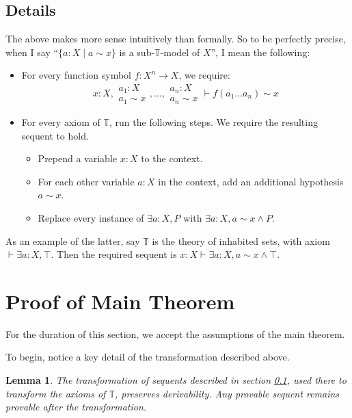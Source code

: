 \documentclass{article}
\newtheorem{lemma}[theorem]{Lemma}
\newcommand*{\T}{\mathbb{T}}
\begin{document}
\subsection{Details} \label{Details}

The above makes more sense intuitively than formally.
So to be perfectly precise, when I say
``\(\{a : X \mid a \sim x\}\) is a sub-\(\T\)-model of \(X\)'',
I mean the following:
\begin{itemize}
    \item For every function symbol \(f : X^n \to X\), we require:
    \[x : X, \substack{a_1 : X \\ a_1 \sim x}, \dots, \substack{a_n : X \\ a_n \sim x} \vdash f(a_1 \dots a_n) \sim x\]
    \item For every axiom of \(\T\), run the following steps. We require the resulting sequent to hold.
    \begin{itemize}
        \item Prepend a variable \(x : X\) to the context.
        \item For each other variable \(a : X\) in the context, add an additional hypothesis \(a \sim x\).
        \item Replace every instance of \(\exists a : X, P\) with \(\exists a : X, a \sim x \land P\).
    \end{itemize}
\end{itemize}

As an example of the latter, say \(\T\) is the theory of inhabited sets, with axiom \(\vdash \exists a : X, \top\).
Then the required sequent is \(x : X \vdash \exists a : X, a \sim x \land \top\).

\section{Proof of Main Theorem}

For the duration of this section, we accept the assumptions of the main theorem.

\vspace{1em}

\noindent To begin, notice a key detail of the transformation described above.
\begin{lemma} \label{transform-lemma}
    The transformation of sequents described in section \ref{Details},
    used there to transform the axioms of \(\T\), preserves derivability.
    Any provable sequent remains provable after the transformation.
\end{lemma}
\end{document}
